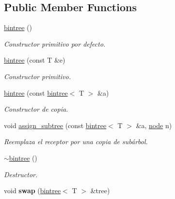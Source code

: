 \subsection*{Public Member Functions}
\begin{DoxyCompactItemize}
\item 
\hyperlink{classbintree_a9fed4a26a9c177dfa14a9cb573b43dca}{bintree} ()
\begin{DoxyCompactList}\small\item\em Constructor primitivo por defecto. \end{DoxyCompactList}\item 
\hyperlink{classbintree_a21aaa03b1510c5ffa52236d2a8973273}{bintree} (const T \&e)
\begin{DoxyCompactList}\small\item\em Constructor primitivo. \end{DoxyCompactList}\item 
\hyperlink{classbintree_a4658c6df869d8b35a72b6cbcf410bc5f}{bintree} (const \hyperlink{classbintree}{bintree}$<$ T $>$ \&a)
\begin{DoxyCompactList}\small\item\em Constructor de copia. \end{DoxyCompactList}\item 
void \hyperlink{classbintree_ab5fb2e54f418de017ba23a2b7084e67e}{assign\-\_\-subtree} (const \hyperlink{classbintree}{bintree}$<$ T $>$ \&a, \hyperlink{classbintree_1_1node}{node} n)
\begin{DoxyCompactList}\small\item\em Reemplaza el receptor por una copia de subárbol. \end{DoxyCompactList}\item 
\hyperlink{classbintree_a7f32fcbdc9aed453025a13cbe93e3b89}{$\sim$bintree} ()
\begin{DoxyCompactList}\small\item\em Destructor. \end{DoxyCompactList}\item 
\hypertarget{classbintree_a88335a1d02be1e28ae8e7f86cbbe7f5a}{void {\bfseries swap} (\hyperlink{classbintree}{bintree}$<$ T $>$ \&tree)}\label{classbintree_a88335a1d02be1e28ae8e7f86cbbe7f5a}


\end{DoxyCompactItemize}
